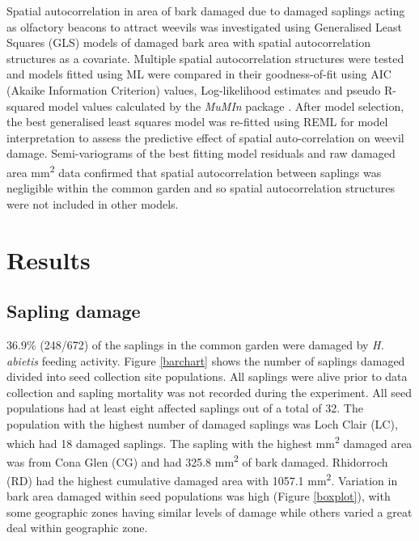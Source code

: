 \documentclass[a4paper, 11pt]{article}
\begin{document}
Spatial autocorrelation in area of bark damaged due to damaged saplings acting as olfactory beacons to attract weevils was investigated using Generalised Least Squares (GLS) models of damaged bark area with spatial autocorrelation structures as a covariate. Multiple spatial autocorrelation structures were tested and models fitted using ML were compared in their goodness-of-fit using AIC (Akaike Information Criterion) values, Log-likelihood estimates and pseudo R-squared model values calculated by the \textit{MuMIn} package \citep{MuMIn}. After model selection, the best generalised least squares model was re-fitted using REML for model interpretation to assess the predictive effect of spatial auto-correlation on weevil damage. Semi-variograms of the best fitting model residuals and raw damaged area mm\textsuperscript{2} data confirmed that spatial autocorrelation between saplings was negligible within the common garden and so spatial autocorrelation structures were not included in other models.

\section*{Results}

\subsection*{Sapling damage}

36.9\% (248/672) of the saplings in the common garden were damaged by \textit{H. abietis} feeding activity. Figure \ref{barchart} shows the number of saplings damaged divided into seed collection site populations. All saplings were alive prior to data collection and sapling mortality was not recorded during the experiment. All seed populations had at least eight affected saplings out of a total of 32. The population with the highest number of damaged saplings was Loch Clair (LC), which had 18 damaged saplings. The sapling with the highest mm\textsuperscript{2} damaged area was from Cona Glen (CG) and had 325.8 mm\textsuperscript{2} of bark damaged. Rhidorroch (RD) had the highest cumulative damaged area with 1057.1 mm\textsuperscript{2}. Variation in bark area damaged within seed populations was high (Figure \ref{boxplot}), with some geographic zones having similar levels of damage while others varied a great deal within geographic zone.
\end{document}
